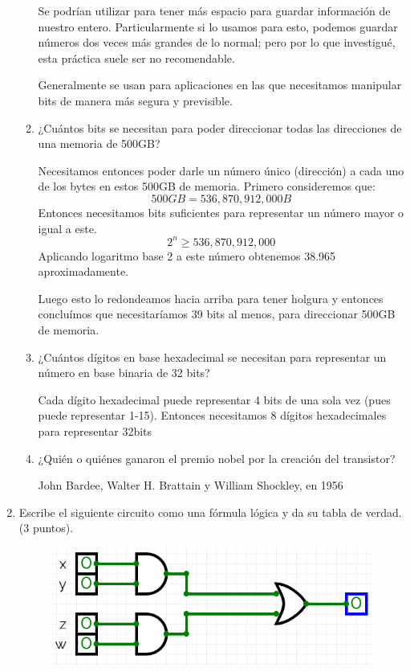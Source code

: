 \documentclass[12pt,letterpaper]{article}
\begin{document}
\begin{enumerate}
\begin{enumerate}
          Se podrían utilizar para tener más espacio para guardar información de nuestro entero. Particularmente si lo usamos para esto, podemos guardar números dos veces más grandes de lo normal; pero por lo que investigué, esta práctica suele ser no recomendable.

          Generalmente se usan para aplicaciones en las que necesitamos manipular bits de manera más segura y previsible.

        \item ¿Cuántos bits se necesitan para poder direccionar todas las direcciones de una memoria de 500GB?


          Necesitamos entonces poder darle un número único (dirección) a cada uno de los bytes en estos 500GB de memoria. Primero consideremos que:
          \[500GB = 536,870,912,000 B\]
          Entonces necesitamos bits suficientes para representar un número mayor o igual a este.
          \[2^n \geq 536,870,912,000\]
          Aplicando logaritmo base 2 a este número obtenemos 38.965 aproximadamente.

          Luego esto lo redondeamos hacia arriba para tener holgura y entonces concluímos que necesitaríamos 39 bits al menos, para direccionar 500GB de memoria.

        \item ¿Cuántos dígitos en base hexadecimal se necesitan para representar un número en base binaria de 32 bits?


          Cada dígito hexadecimal puede representar 4 bits de una sola vez (pues puede representar 1-15). Entonces necesitamos 8 dígitos hexadecimales para representar 32bits

        \item ¿Quién o quiénes ganaron el premio nobel por la creación del transistor?


          John Bardee, Walter H. Brattain y William Shockley, en 1956

    \end{enumerate}


    \item  Escribe el siguiente circuito como una fórmula lógica y da su tabla de verdad. (3 puntos).
    \begin{figure}[H]
        \centering
        \includegraphics[width=0.75\linewidth]{circuito.png}
    \end{figure}


\end{enumerate}
\end{document}
